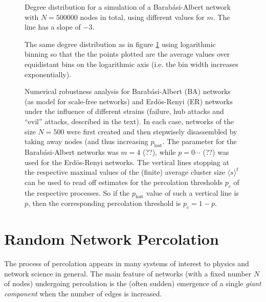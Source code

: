 \documentclass{scrartcl}
\begin{document}
\begin{figure}
    \caption{Degree distribution for a simulation of a Barab\'asi-Albert
    network with $N=500000$ nodes in total, using different values for
    $m$. The line has a slope of $-3$.}
    \label{fig:22_plot}
\end{figure}
\begin{figure}
    \caption{The same degree distribution as in figure \ref{fig:22_plot}
    using logarithmic binning so that the the points plotted are the average
    values over equidistant bins on the logarithmic axis (i.e. the bin width
    increases exponentially).}
    \label{fig:22_logplot}
\end{figure}

\begin{figure}
    \vspace*{-0.75cm}
    \caption{Numerical robustness analysis for Barab\'asi-Albert (BA) networks
    (as model for scale-free networks) and Erdös-Renyi (ER) networks under
    the influence of different strains (failure, hub attacks and
    \enquote{evil} attacks, described in the text). In each case, networks
    of the size $N=500$ were first created and then stepwisely disassembled
    by taking away nodes (and thus increasing $p_\mathrm{lost}$. The
    parameter for the Barab\'asi-Albert networks was $m = 4$ (??), while
    $p=0\cdots$ (??) was used for the Erdös-Renyi networks. The vertical
    lines stopping at the respective maximal values of the (finite) average
    cluster size $\langle s\rangle^\mathrm{f}$ can be used to read off
    estimates for the percolation thresholds $p_c$ of the respective
    processes. So if the $p_\mathrm{lost}$ value of such a vertical line is
    $p$, then the corresponding percolation threshold is $p_c = 1-p$.}
    \label{fig:24_ba}
\end{figure}

\clearpage
\clearpage


\section{Random Network Percolation}
The process of percolation appears in many systems of interest to physics
and network science in general. The main feature of networks (with a fixed
number $N$ of nodes) undergoing percolation is the (often sudden) emergence
of a single \emph{giant component} when the number of edges is increased.
\end{document}
